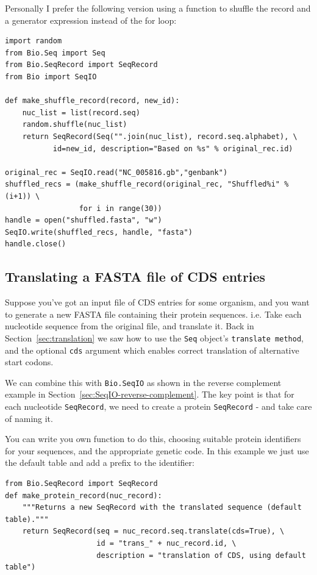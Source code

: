 \documentclass{report}
\begin{document}
Personally I prefer the following version using a function to shuffle the record
and a generator expression instead of the for loop:

\begin{verbatim}
import random
from Bio.Seq import Seq
from Bio.SeqRecord import SeqRecord
from Bio import SeqIO

def make_shuffle_record(record, new_id):
    nuc_list = list(record.seq)
    random.shuffle(nuc_list)
    return SeqRecord(Seq("".join(nuc_list), record.seq.alphabet), \
           id=new_id, description="Based on %s" % original_rec.id)
   
original_rec = SeqIO.read("NC_005816.gb","genbank")
shuffled_recs = (make_shuffle_record(original_rec, "Shuffled%i" % (i+1)) \
                 for i in range(30))
handle = open("shuffled.fasta", "w")
SeqIO.write(shuffled_recs, handle, "fasta")
handle.close()
\end{verbatim}

\subsection{Translating a FASTA file of CDS entries}
\label{sec:SeqIO-translate}
Suppose you've got an input file of CDS entries for some organism, and you
want to generate a new FASTA file containing their protein sequences.  i.e.
Take each nucleotide sequence from the original file, and translate it.
Back in Section~\ref{sec:translation} we saw how to use the \verb|Seq|
object's \verb|translate method|, and the optional \verb|cds| argument
which enables correct translation of alternative start codons.

We can combine this with \verb|Bio.SeqIO| as
shown in the reverse complement example in Section~\ref{sec:SeqIO-reverse-complement}.
The key point is that for each nucleotide \verb|SeqRecord|, we need to create
a protein \verb|SeqRecord| - and take care of naming it.

You can write you own function to do this, choosing suitable protein identifiers
for your sequences, and the appropriate genetic code.  In this example we just
use the default table and add a prefix to the identifier:

\begin{verbatim}
from Bio.SeqRecord import SeqRecord
def make_protein_record(nuc_record):
    """Returns a new SeqRecord with the translated sequence (default table)."""
    return SeqRecord(seq = nuc_record.seq.translate(cds=True), \
                     id = "trans_" + nuc_record.id, \
                     description = "translation of CDS, using default table")
\end{verbatim}
\end{document}
